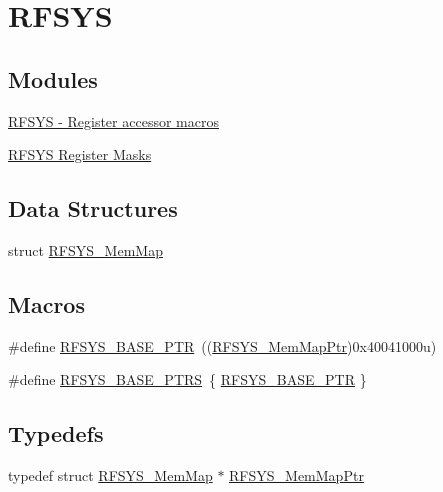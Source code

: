 \hypertarget{group___r_f_s_y_s___peripheral}{}\section{R\+F\+S\+Y\+S}
\label{group___r_f_s_y_s___peripheral}
\subsection*{Modules}
\begin{DoxyCompactItemize}
\item 
\hyperlink{group___r_f_s_y_s___register___accessor___macros}{R\+F\+S\+Y\+S -\/ Register accessor macros}
\item 
\hyperlink{group___r_f_s_y_s___register___masks}{R\+F\+S\+Y\+S Register Masks}
\end{DoxyCompactItemize}
\subsection*{Data Structures}
\begin{DoxyCompactItemize}
\item 
struct \hyperlink{struct_r_f_s_y_s___mem_map}{R\+F\+S\+Y\+S\+\_\+\+Mem\+Map}
\end{DoxyCompactItemize}
\subsection*{Macros}
\begin{DoxyCompactItemize}
\item 
\#define \hyperlink{group___r_f_s_y_s___peripheral_ga2dab66eae1abcaf22879dbce661ea2fa}{R\+F\+S\+Y\+S\+\_\+\+B\+A\+S\+E\+\_\+\+P\+T\+R}~((\hyperlink{group___r_f_s_y_s___peripheral_gaea9e2f6aeeb4976615e3c3dd87acff9e}{R\+F\+S\+Y\+S\+\_\+\+Mem\+Map\+Ptr})0x40041000u)
\item 
\#define \hyperlink{group___r_f_s_y_s___peripheral_ga59f6caa8732744ac3a9f91828ec2daa1}{R\+F\+S\+Y\+S\+\_\+\+B\+A\+S\+E\+\_\+\+P\+T\+R\+S}~\{ \hyperlink{group___r_f_s_y_s___peripheral_ga2dab66eae1abcaf22879dbce661ea2fa}{R\+F\+S\+Y\+S\+\_\+\+B\+A\+S\+E\+\_\+\+P\+T\+R} \}
\end{DoxyCompactItemize}
\subsection*{Typedefs}
\begin{DoxyCompactItemize}
\item 
typedef struct \hyperlink{struct_r_f_s_y_s___mem_map}{R\+F\+S\+Y\+S\+\_\+\+Mem\+Map} $\ast$ \hyperlink{group___r_f_s_y_s___peripheral_gaea9e2f6aeeb4976615e3c3dd87acff9e}{R\+F\+S\+Y\+S\+\_\+\+Mem\+Map\+Ptr}
\end{DoxyCompactItemize}


